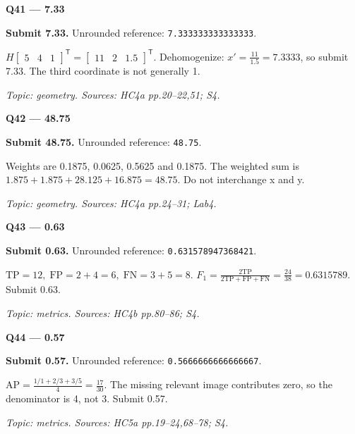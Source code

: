 \documentclass[11pt,a4paper]{article}
\begin{document}
\par\vspace{12pt}
\begin{minipage}{\linewidth}
\textbf{Q41 — 7.33}\par\smallskip
\textbf{Submit 7.33.} Unrounded reference: \texttt{7.333333333333333}.\par
\(H\begin{bmatrix}5&4&1\end{bmatrix}^{\mathsf T}=\begin{bmatrix}11&2&1.5\end{bmatrix}^{\mathsf T}\). Dehomogenize: \(x'=\frac{11}{1.5}=7.3333\),\allowbreak{} so submit 7.33. The third coordinate is not generally 1.\par
{\small\itshape Topic: geometry. Sources: HC4a pp.20–22,\allowbreak{}51; S4.}

\end{minipage}
\par\vspace{12pt}
\begin{minipage}{\linewidth}
\textbf{Q42 — 48.75}\par\smallskip
\textbf{Submit 48.75.} Unrounded reference: \texttt{48.75}.\par
Weights are 0.1875,\allowbreak{} 0.0625,\allowbreak{} 0.5625 and 0.1875. The weighted sum is \(1.875+1.875+28.125+16.875=48.75\). Do not interchange x and y.\par
{\small\itshape Topic: geometry. Sources: HC4a pp.24–31; Lab4.}

\end{minipage}
\par\vspace{12pt}
\begin{minipage}{\linewidth}
\textbf{Q43 — 0.63}\par\smallskip
\textbf{Submit 0.63.} Unrounded reference: \texttt{0.631578947368421}.\par
\(\mathrm{TP}=12,\;\mathrm{FP}=2+4=6,\;\mathrm{FN}=3+5=8\). \(F_1=\frac{2\mathrm{TP}}{2\mathrm{TP}+\mathrm{FP}+\mathrm{FN}}=\frac{24}{38}=0.6315789\). Submit 0.63.\par
{\small\itshape Topic: metrics. Sources: HC4b pp.80–86; S4.}

\end{minipage}
\par\vspace{12pt}
\begin{minipage}{\linewidth}
\textbf{Q44 — 0.57}\par\smallskip
\textbf{Submit 0.57.} Unrounded reference: \texttt{0.5666666666666667}.\par
\(\mathrm{AP}=\frac{1/1+2/3+3/5}{4}=\frac{17}{30}\). The missing relevant image contributes zero,\allowbreak{} so the denominator is 4,\allowbreak{} not 3. Submit 0.57.\par
{\small\itshape Topic: metrics. Sources: HC5a pp.19–24,\allowbreak{}68–78; S4.}

\end{minipage}
\end{document}
